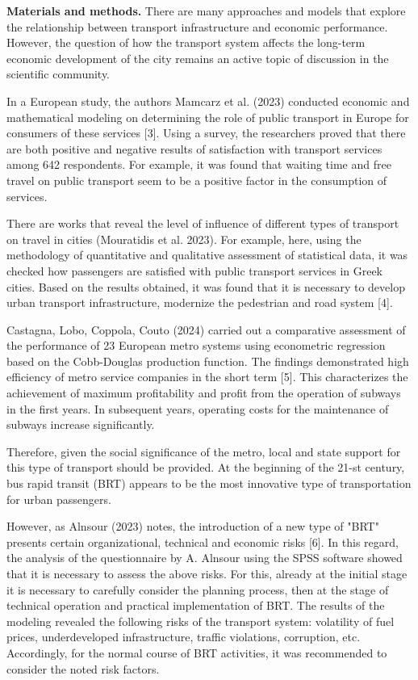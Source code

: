 \begin{multicols}{2}
{\bfseries Materials and methods.} There are many approaches and models
that explore the relationship between transport infrastructure and
economic performance. However, the question of how the transport system
affects the long-term economic development of the city remains an active
topic of discussion in the scientific community.

In a European study, the authors Mamcarz et al. (2023) conducted
economic and mathematical modeling on determining the role of public
transport in Europe for consumers of these services {[}3{]}. Using a
survey, the researchers proved that there are both positive and negative
results of satisfaction with transport services among 642 respondents.
For example, it was found that waiting time and free travel on public
transport seem to be a positive factor in the consumption of services.

There are works that reveal the level of influence of different types of
transport on travel in cities (Mouratidis et al. 2023). For example,
here, using the methodology of quantitative and qualitative assessment
of statistical data, it was checked how passengers are satisfied with
public transport services in Greek cities. Based on the results
obtained, it was found that it is necessary to develop urban transport
infrastructure, modernize the pedestrian and road system {[}4{]}.

Castagna, Lobo, Coppola, Couto (2024) carried out a comparative
assessment of the performance of 23 European metro systems using
econometric regression based on the Cobb-Douglas production function.
The findings demonstrated high efficiency of metro service companies in
the short term {[}5{]}. This characterizes the achievement of maximum
profitability and profit from the operation of subways in the first
years. In subsequent years, operating costs for the maintenance of
subways increase significantly.

Therefore, given the social significance of the metro, local and state
support for this type of transport should be provided. At the beginning
of the 21-st century, bus rapid transit (BRT) appears to be the most
innovative type of transportation for urban passengers.

However, as Alnsour (2023) notes, the introduction of a new type of
"BRT" presents certain organizational, technical and economic risks
{[}6{]}. In this regard, the analysis of the questionnaire by A. Alnsour
using the SPSS software showed that it is necessary to assess the above
risks. For this, already at the initial stage it is necessary to
carefully consider the planning process, then at the stage of technical
operation and practical implementation of BRT. The results of the
modeling revealed the following risks of the transport system:
volatility of fuel prices, underdeveloped infrastructure, traffic
violations, corruption, etc. Accordingly, for the normal course of BRT
activities, it was recommended to consider the noted risk factors.


\end{multicols}
